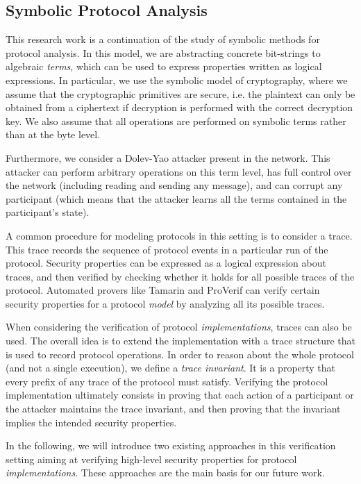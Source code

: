 \documentclass{article}
\begin{document}
\subsection{Symbolic Protocol Analysis}
\label{sec:symbolic-analysis}

This research work is a continuation of the study of symbolic methods for protocol analysis. In this model, we are abstracting concrete bit-strings to algebraic \emph{terms}, which can be used to express properties written as logical expressions.
In particular, we use the symbolic model of cryptography, where we assume that the cryptographic primitives are secure, i.e. the plaintext can only be obtained from a ciphertext if decryption is performed with the correct decryption key. We also assume that all operations are performed on symbolic terms rather than at the byte level.

Furthermore, we consider a Dolev-Yao\cite{dolev1983security} attacker present in the network. This attacker can perform arbitrary operations on this term level, has full control over the network (including reading and sending any message), and can corrupt any participant (which means that the attacker learns all the terms contained in the participant's state).

A common procedure for modeling protocols in this setting is to consider a trace. This trace records the sequence of protocol events in a particular run of the protocol.
Security properties can be expressed as a logical expression about traces, and then verified by checking whether it holds for all possible traces of the protocol.
Automated provers like Tamarin and ProVerif can verify certain security properties for a protocol \emph{model} by analyzing all its possible traces.

When considering the verification of protocol \emph{implementations}, traces can also be used. The overall idea is to extend the implementation with a trace structure that is used to record protocol operations. In order to reason about the whole protocol (and not a single execution), we define a \emph{trace invariant}. It is a property that every prefix of any trace of the protocol must satisfy.
Verifying the protocol implementation ultimately consists in proving that each action of a participant or the attacker maintains the trace invariant, and then proving that the invariant implies the intended security properties.

In the following, we will introduce two existing approaches in this verification setting  aiming at verifying high-level security properties for protocol \emph{implementations}. These approaches are the main basis for our future work.
\end{document}
